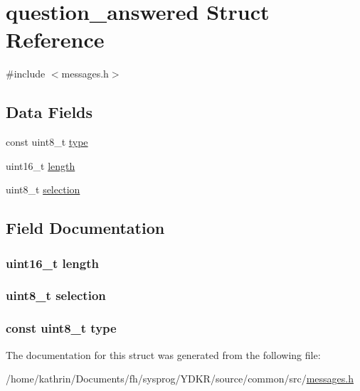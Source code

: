 \hypertarget{structquestion__answered}{
\section{question\_\-answered Struct Reference}
\label{structquestion__answered}
}


{\ttfamily \#include $<$messages.h$>$}

\subsection*{Data Fields}
\begin{DoxyCompactItemize}
\item 
const uint8\_\-t \hyperlink{structquestion__answered_aca7dafb0092715a03dd40f45fc607f2a}{type}
\item 
uint16\_\-t \hyperlink{structquestion__answered_a1892eba2086d12ac2b09005aeb09ea3b}{length}
\item 
uint8\_\-t \hyperlink{structquestion__answered_af190e8c7f8c6caf004f782b3aa7b5021}{selection}
\end{DoxyCompactItemize}


\subsection{Field Documentation}
\hypertarget{structquestion__answered_a1892eba2086d12ac2b09005aeb09ea3b}{
\subsubsection[{length}]{\setlength{\rightskip}{0pt plus 5cm}uint16\_\-t {\bf length}}}
\label{structquestion__answered_a1892eba2086d12ac2b09005aeb09ea3b}
\hypertarget{structquestion__answered_af190e8c7f8c6caf004f782b3aa7b5021}{
\subsubsection[{selection}]{\setlength{\rightskip}{0pt plus 5cm}uint8\_\-t {\bf selection}}}
\label{structquestion__answered_af190e8c7f8c6caf004f782b3aa7b5021}
\hypertarget{structquestion__answered_aca7dafb0092715a03dd40f45fc607f2a}{
\subsubsection[{type}]{\setlength{\rightskip}{0pt plus 5cm}const uint8\_\-t {\bf type}}}
\label{structquestion__answered_aca7dafb0092715a03dd40f45fc607f2a}


The documentation for this struct was generated from the following file:\begin{DoxyCompactItemize}
\item 
/home/kathrin/Documents/fh/sysprog/YDKR/source/common/src/\hyperlink{messages_8h}{messages.h}\end{DoxyCompactItemize}

